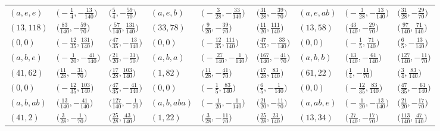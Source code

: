 \documentclass[pdftex]{sigma}
\theoremstyle{definition}
\numberwithin{equation}{section}
\begin{document}
\begin{landscape}
\begin{table}[th]
\begin{tabular}{|lll|lll|lll|}
\\\hline
$(a, e, e)$ & $\bigl(-\frac{1}{4}, -\frac{13}{140}\bigr)$ & $\bigl(\frac{5}{4}, -\frac{59}{70}\bigr)$ & $(a, e, b)$ & $\bigl(-\frac{3}{28}, -\frac{33}{140}\bigr)$ & $\bigl(\frac{31}{28}, -\frac{39}{70}\bigr)$ & $(a, e, ab)$ & $\bigl(-\frac{3}{28}, -\frac{13}{140}\bigr)$ & $\bigl(\frac{31}{28}, -\frac{29}{70}\bigr)$
\\
$(13, 118)$ & $\bigl(\frac{83}{140}, -\frac{59}{70}\bigr)$ & $\bigl(\frac{57}{140}, \frac{131}{140}\bigr)$ & $(33, 78)$ & $\bigl(\frac{9}{20}, -\frac{39}{70}\bigr)$ & $\bigl(\frac{11}{20}, \frac{111}{140}\bigr)$ & $(13, 58)$ & $\bigl(\frac{43}{140}, -\frac{29}{70}\bigr)$ & $\bigl(\frac{97}{140}, \frac{71}{140}\bigr)$
\\
$(0, 0)$ & $\bigl(-\frac{12}{35}, \frac{131}{140}\bigr)$ & $\bigl(\frac{47}{35}, -\frac{13}{140}\bigr)$ & $(0, 0)$ & $\bigl(-\frac{12}{35}, \frac{111}{140}\bigr)$ & $\bigl(\frac{47}{35}, -\frac{33}{140}\bigr)$ & $(0, 0)$ & $\bigl(-\frac{1}{5}, \frac{71}{140}\bigr)$ & $\bigl(\frac{6}{5}, -\frac{13}{140}\bigr)$
\\\hline
$(a, b, e)$ & $\bigl(-\frac{1}{20}, -\frac{41}{140}\bigr)$ & $\bigl(\frac{21}{20}, -\frac{31}{70}\bigr)$ & $(a, b, a)$ & $\bigl(-\frac{27}{140}, -\frac{1}{140}\bigr)$ & $\bigl(\frac{167}{140}, -\frac{41}{70}\bigr)$ & $(a, b, b)$ & $\bigl(\frac{13}{140}, -\frac{61}{140}\bigr)$ & $\bigl(\frac{127}{140}, -\frac{11}{70}\bigr)$
\\
$(41, 62)$ & $\bigl(\frac{11}{28}, -\frac{31}{70}\bigr)$ & $\bigl(\frac{17}{28}, \frac{103}{140}\bigr)$ & $(1, 82)$ & $\bigl(\frac{11}{28}, -\frac{41}{70}\bigr)$ & $\bigl(\frac{17}{28}, \frac{83}{140}\bigr)$ & $(61, 22)$ & $\bigl(\frac{1}{4}, -\frac{11}{70}\bigr)$ & $\bigl(\frac{3}{4}, \frac{83}{140}\bigr)$
\\
$(0, 0)$ & $\bigl(-\frac{12}{35}, \frac{103}{140}\bigr)$ & $\bigl(\frac{47}{35}, -\frac{41}{140}\bigr)$ & $(0, 0)$ & $\bigl(-\frac{1}{5}, \frac{83}{140}\bigr)$ & $\bigl(\frac{6}{5}, -\frac{1}{140}\bigr)$ & $(0, 0)$ & $\bigl(-\frac{12}{35}, \frac{83}{140}\bigr)$ & $\bigl(\frac{47}{35}, -\frac{61}{140}\bigr)$
\\\hline
$(a, b, ab)$ & $\bigl(\frac{13}{140}, -\frac{41}{140}\bigr)$ & $\bigl(\frac{127}{140}, -\frac{1}{70}\bigr)$ & $(a, b, aba)$ & $\bigl(-\frac{1}{20}, -\frac{1}{140}\bigr)$ & $\bigl(\frac{21}{20}, -\frac{11}{70}\bigr)$ & $(a, ab, e)$ & $\bigl(-\frac{1}{20}, -\frac{13}{140}\bigr)$ & $\bigl(\frac{21}{20}, -\frac{17}{70}\bigr)$
\\
$(41, 2)$ & $\bigl(\frac{3}{28}, -\frac{1}{70}\bigr)$ & $\bigl(\frac{25}{28}, \frac{43}{140}\bigr)$ & $(1, 22)$ & $\bigl(\frac{3}{28}, -\frac{11}{70}\bigr)$ & $\bigl(\frac{25}{28}, \frac{23}{140}\bigr)$ & $(13, 34)$ & $\bigl(\frac{27}{140}, -\frac{17}{70}\bigr)$ & $\bigl(\frac{113}{140}, \frac{47}{140}\bigr)$

\end{tabular}
\end{table}
\end{landscape}
\end{document}
